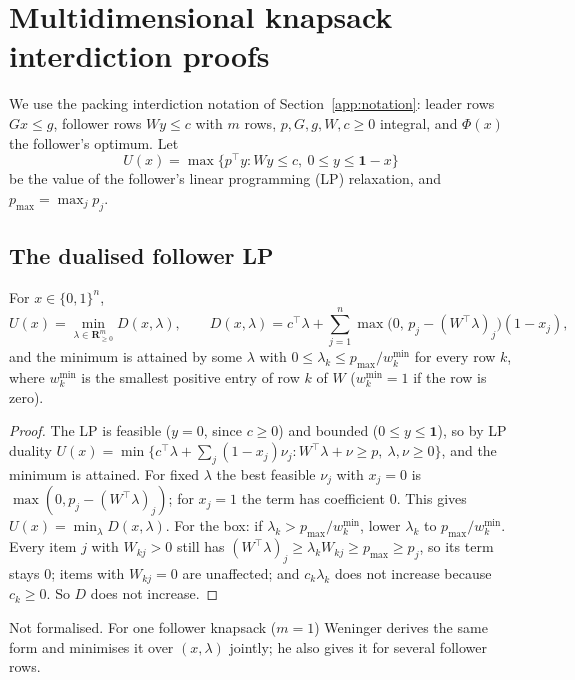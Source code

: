 \section{Multidimensional knapsack interdiction proofs}\label{app:mkip}

We use the packing interdiction notation of Section~\ref{app:notation}: leader
rows $Gx\le g$, follower rows $Wy\le c$ with $m$ rows, $p,G,g,W,c\ge 0$ integral,
and $\Phi(x)$ the follower's optimum. Let
\[
  U(x)=\max\bigl\{p^{\top}y : Wy\le c,\ 0\le y\le\mathbf{1}-x\bigr\}
\]
be the value of the follower's linear programming (LP) relaxation, and
$p_{\max}=\max_jp_j$.

\subsection{The dualised follower LP}

\begin{lemma}\label{lem:mkip-dual}
For $x\in\{0,1\}^n$,
\[
  U(x)=\min_{\lambda\in\mathbf{R}^m_{\ge 0}}D(x,\lambda),\qquad
  D(x,\lambda)=c^{\top}\lambda+\sum_{j=1}^n\max\bigl(0,\,p_j-(W^{\top}\lambda)_j\bigr)(1-x_j),
\]
and the minimum is attained by some $\lambda$ with $0\le\lambda_k\le p_{\max}/w^{\min}_k$
for every row $k$, where $w^{\min}_k$ is the smallest positive entry of row $k$
of $W$ ($w^{\min}_k=1$ if the row is zero).
\end{lemma}
\begin{proof}
The LP is feasible ($y=0$, since $c\ge 0$) and bounded ($0\le y\le\mathbf{1}$), so by
LP duality $U(x)=\min\{c^{\top}\lambda+\sum_j(1-x_j)\nu_j : W^{\top}\lambda+\nu\ge p,\ \lambda,\nu\ge 0\}$,
and the minimum is attained. For fixed $\lambda$ the best feasible $\nu_j$ with
$x_j=0$ is $\max(0,p_j-(W^{\top}\lambda)_j)$; for $x_j=1$ the term has coefficient
$0$. This gives $U(x)=\min_\lambda D(x,\lambda)$. For the box: if
$\lambda_k>p_{\max}/w^{\min}_k$, lower $\lambda_k$ to $p_{\max}/w^{\min}_k$. Every
item $j$ with $W_{kj}>0$ still has $(W^{\top}\lambda)_j\ge\lambda_kW_{kj}\ge p_{\max}\ge p_j$,
so its term stays $0$; items with $W_{kj}=0$ are unaffected; and $c_k\lambda_k$
does not increase because $c_k\ge 0$. So $D$ does not increase.
\end{proof}
\noindent Not formalised. For one follower knapsack ($m=1$) Weninger derives
the same form and minimises it over $(x,\lambda)$ jointly; he also gives it
for several follower rows.\cite{weninger2026approx}

